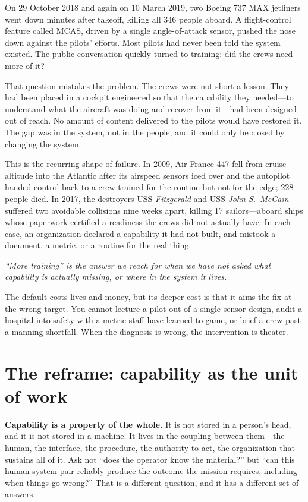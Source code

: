 \documentclass[11pt]{article}
\newcommand{\pullquote}[1]{%
  \begin{center}\begin{minipage}{0.86\linewidth}
  \color{lensquote}\itshape\large\RaggedRight #1
  \end{minipage}\end{center}}
\newcommand{\lead}[1]{{\color{lensaccent}\bfseries #1}}
\begin{document}
On 29 October 2018 and again on 10 March 2019, two Boeing 737 MAX jetliners went down minutes after takeoff, killing all 346 people aboard. A flight-control feature called MCAS, driven by a single angle-of-attack sensor, pushed the nose down against the pilots' efforts. Most pilots had never been told the system existed. The public conversation quickly turned to training: did the crews need more of it?

That question mistakes the problem. The crews were not short a lesson. They had been placed in a cockpit engineered so that the capability they needed---to understand what the aircraft was doing and recover from it---had been designed out of reach. No amount of content delivered to the pilots would have restored it. The gap was in the system, not in the people, and it could only be closed by changing the system.

This is the recurring shape of failure. In 2009, Air France 447 fell from cruise altitude into the Atlantic after its airspeed sensors iced over and the autopilot handed control back to a crew trained for the routine but not for the edge; 228 people died. In 2017, the destroyers USS \emph{Fitzgerald} and USS \emph{John S.\ McCain} suffered two avoidable collisions nine weeks apart, killing 17 sailors---aboard ships whose paperwork certified a readiness the crews did not actually have. In each case, an organization declared a capability it had not built, and mistook a document, a metric, or a routine for the real thing.

\pullquote{``More training'' is the answer we reach for when we have not asked what capability is actually missing, or where in the system it lives.}

The default costs lives and money, but its deeper cost is that it aims the fix at the wrong target. You cannot lecture a pilot out of a single-sensor design, audit a hospital into safety with a metric staff have learned to game, or brief a crew past a manning shortfall. When the diagnosis is wrong, the intervention is theater.

\section{The reframe: capability as the unit of work}

\lead{Capability is a property of the whole.} It is not stored in a person's head, and it is not stored in a machine. It lives in the coupling between them---the human, the interface, the procedure, the authority to act, the organization that sustains all of it. Ask not ``does the operator know the material?'' but ``can this human-system pair reliably produce the outcome the mission requires, including when things go wrong?'' That is a different question, and it has a different set of answers.
\end{document}
